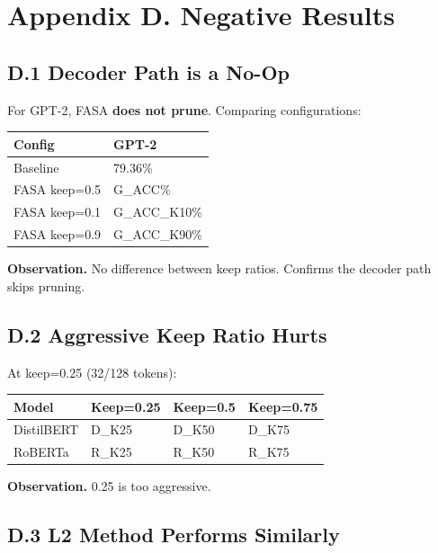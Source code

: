 
\section{Appendix D. Negative Results}

\subsection{D.1 Decoder Path is a No-Op}

For GPT-2, FASA \textbf{does not prune}. Comparing configurations:

\begin{table}[H]
\centering
\small
\begin{tabular}{ll}
\toprule
\textbf{Config} & \textbf{GPT-2} \\
\midrule
Baseline & 79.36\% \\
FASA keep=0.5 & {{G\_ACC}}\% \\
FASA keep=0.1 & {{G\_ACC\_K10}}\% \\
FASA keep=0.9 & {{G\_ACC\_K90}}\% \\
\bottomrule
\end{tabular}
\end{table}

\textbf{Observation.} No difference between keep ratios. Confirms the decoder 
path skips pruning.

\subsection{D.2 Aggressive Keep Ratio Hurts}

At keep=0.25 (32/128 tokens):

\begin{table}[H]
\centering
\small
\begin{tabular}{llll}
\toprule
\textbf{Model} & \textbf{Keep=0.25} & \textbf{Keep=0.5} & \textbf{Keep=0.75} \\
\midrule
DistilBERT & {{D\_K25}} & {{D\_K50}} & {{D\_K75}} \\
RoBERTa & {{R\_K25}} & {{R\_K50}} & {{R\_K75}} \\
\bottomrule
\end{tabular}
\end{table}

\textbf{Observation.} 0.25 is too aggressive.

\subsection{D.3 L2 Method Performs Similarly}

